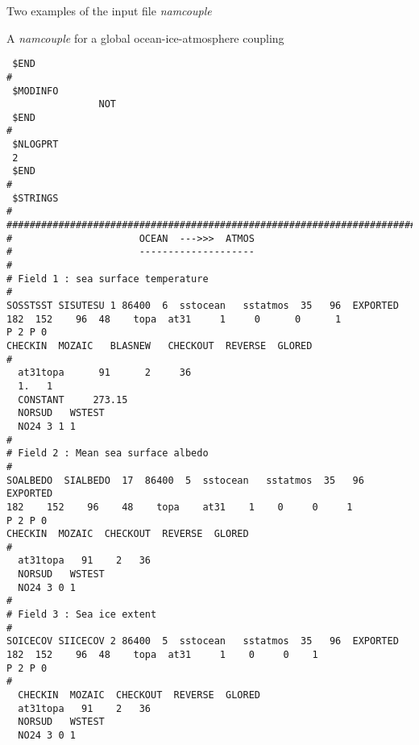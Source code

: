 \begin{section}{Two examples of the input file {\em namcouple}}
\begin{subsection}{A {\em namcouple} for a global ocean-ice-atmosphere coupling}
\begin{verbatim}
 $END                                                                       
#
 $MODINFO
                NOT
 $END
#
 $NLOGPRT
 2
 $END
#
 $STRINGS                                                                  
#     
############################################################################ 
#                      OCEAN  --->>>  ATMOS                                  
#                      --------------------                                  
#
# Field 1 : sea surface temperature
#                          
SOSSTSST SISUTESU 1 86400  6  sstocean   sstatmos  35   96  EXPORTED        
182  152    96  48    topa  at31     1     0      0      1 
P 2 P 0                 
CHECKIN  MOZAIC   BLASNEW   CHECKOUT  REVERSE  GLORED                      
# 
  at31topa      91      2     36                                            
  1.   1                                                                     
  CONSTANT     273.15                                                       
  NORSUD   WSTEST                                                           
  NO24 3 1 1                                                                  
#                                                                       
# Field 2 : Mean sea surface albedo                                     
#                                                                       
SOALBEDO  SIALBEDO  17  86400  5  sstocean   sstatmos  35   96 EXPORTED 
182    152    96    48    topa    at31    1    0     0     1  
P 2 P 0           
CHECKIN  MOZAIC  CHECKOUT  REVERSE  GLORED                             
#                                                                       
  at31topa   91    2   36                                                
  NORSUD   WSTEST                                                         
  NO24 3 0 1                                                              
#                                                                       
# Field 3 : Sea ice extent                                              
#                                                                       
SOICECOV SIICECOV 2 86400  5  sstocean   sstatmos  35   96  EXPORTED    
182  152    96  48    topa  at31     1    0     0    1 
P 2 P 0                  
#                                                                       
  CHECKIN  MOZAIC  CHECKOUT  REVERSE  GLORED                              
  at31topa   91    2   36                                                
  NORSUD   WSTEST                                                         
  NO24 3 0 1                                          

\end{verbatim}
\end{subsection}
\end{section}
